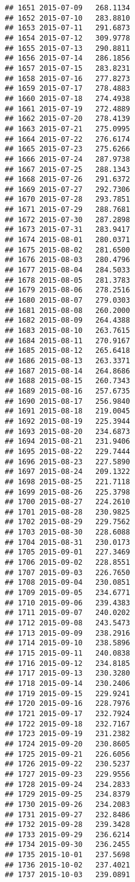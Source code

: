 \documentclass[
]{article}
\begin{document}
\begin{verbatim}
## 1651 2015-07-09   268.1134
## 1652 2015-07-10   283.8810
## 1653 2015-07-11   291.6873
## 1654 2015-07-12   309.9778
## 1655 2015-07-13   290.8811
## 1656 2015-07-14   286.1856
## 1657 2015-07-15   283.8231
## 1658 2015-07-16   277.8273
## 1659 2015-07-17   278.4883
## 1660 2015-07-18   274.4938
## 1661 2015-07-19   272.4889
## 1662 2015-07-20   278.4139
## 1663 2015-07-21   275.0995
## 1664 2015-07-22   276.6174
## 1665 2015-07-23   275.6266
## 1666 2015-07-24   287.9738
## 1667 2015-07-25   288.1343
## 1668 2015-07-26   291.6372
## 1669 2015-07-27   292.7306
## 1670 2015-07-28   293.7851
## 1671 2015-07-29   288.7681
## 1672 2015-07-30   287.2898
## 1673 2015-07-31   283.9417
## 1674 2015-08-01   280.0371
## 1675 2015-08-02   281.6500
## 1676 2015-08-03   280.4796
## 1677 2015-08-04   284.5033
## 1678 2015-08-05   281.3783
## 1679 2015-08-06   278.2516
## 1680 2015-08-07   279.0303
## 1681 2015-08-08   260.2000
## 1682 2015-08-09   264.4388
## 1683 2015-08-10   263.7615
## 1684 2015-08-11   270.9167
## 1685 2015-08-12   265.6418
## 1686 2015-08-13   263.3371
## 1687 2015-08-14   264.8686
## 1688 2015-08-15   260.7343
## 1689 2015-08-16   257.6735
## 1690 2015-08-17   256.9840
## 1691 2015-08-18   219.0045
## 1692 2015-08-19   225.3944
## 1693 2015-08-20   234.6873
## 1694 2015-08-21   231.9406
## 1695 2015-08-22   229.7444
## 1696 2015-08-23   227.5890
## 1697 2015-08-24   209.1322
## 1698 2015-08-25   221.7118
## 1699 2015-08-26   225.3798
## 1700 2015-08-27   224.2610
## 1701 2015-08-28   230.9825
## 1702 2015-08-29   229.7562
## 1703 2015-08-30   228.6088
## 1704 2015-08-31   230.0173
## 1705 2015-09-01   227.3469
## 1706 2015-09-02   228.8551
## 1707 2015-09-03   226.7650
## 1708 2015-09-04   230.0851
## 1709 2015-09-05   234.6771
## 1710 2015-09-06   239.4383
## 1711 2015-09-07   240.0202
## 1712 2015-09-08   243.5473
## 1713 2015-09-09   238.2916
## 1714 2015-09-10   238.5896
## 1715 2015-09-11   240.0838
## 1716 2015-09-12   234.8185
## 1717 2015-09-13   230.3280
## 1718 2015-09-14   230.2406
## 1719 2015-09-15   229.9241
## 1720 2015-09-16   228.7976
## 1721 2015-09-17   232.7924
## 1722 2015-09-18   232.7167
## 1723 2015-09-19   231.2382
## 1724 2015-09-20   230.8605
## 1725 2015-09-21   226.6056
## 1726 2015-09-22   230.5237
## 1727 2015-09-23   229.9556
## 1728 2015-09-24   234.2833
## 1729 2015-09-25   234.8379
## 1730 2015-09-26   234.2083
## 1731 2015-09-27   232.8486
## 1732 2015-09-28   239.3428
## 1733 2015-09-29   236.6214
## 1734 2015-09-30   236.2455
## 1735 2015-10-01   237.5698
## 1736 2015-10-02   237.4021
## 1737 2015-10-03   239.0891

\end{verbatim}
\end{document}
